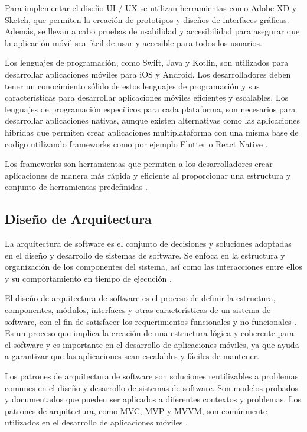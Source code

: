 \documentclass[runningheads]{llncs}
\begin{document}
Para implementar el diseño UI / UX se utilizan herramientas como Adobe XD y Sketch, que permiten la creación de prototipos y diseños de interfaces gráficas. Además, se llevan a cabo pruebas de usabilidad y accesibilidad para asegurar que la aplicación móvil sea fácil de usar y accesible para todos los usuarios.

Los lenguajes de programación, como Swift, Java y Kotlin, son utilizados para desarrollar aplicaciones móviles para iOS y Android. Los desarrolladores deben tener un conocimiento sólido de estos lenguajes de programación y sus características para desarrollar aplicaciones móviles eficientes y escalables. Los lenguajes de programación específicos para cada plataforma, son necesarios para desarrollar aplicaciones nativas, aunque existen alternativas como las aplicaciones hibridas que permiten crear aplicaciones multiplataforma con una misma base de codigo utilizando frameworks como por ejemplo Flutter o React Native \cite{Cita7}.

Los frameworks son herramientas que permiten a los desarrolladores crear aplicaciones de manera más rápida y eficiente al proporcionar una estructura y conjunto de herramientas predefinidas \cite{Cita8}. 

\subsection{Diseño de Arquitectura}
La arquitectura de software es el conjunto de decisiones y soluciones adoptadas en el diseño y desarrollo de sistemas de software. Se enfoca en la estructura y organización de los componentes del sistema, así como las interacciones entre ellos y su comportamiento en tiempo de ejecución \cite{Cita9}.

El diseño de arquitectura de software es el proceso de definir la estructura, componentes, módulos, interfaces y otras características de un sistema de software, con el fin de satisfacer los requerimientos funcionales y no funcionales \cite{Cita9,Cita11}. Es un proceso que implica la creación de una estructura lógica y coherente para el software y es importante en el desarrollo de aplicaciones móviles, ya que ayuda a garantizar que las aplicaciones sean escalables y fáciles de mantener.

Los patrones de arquitectura de software son soluciones reutilizables a problemas comunes en el diseño y desarrollo de sistemas de software. Son modelos probados y documentados que pueden ser aplicados a diferentes contextos y problemas. Los patrones de arquitectura, como MVC, MVP y MVVM, son comúnmente utilizados en el desarrollo de aplicaciones móviles \cite{Cita11}. 
\end{document}

